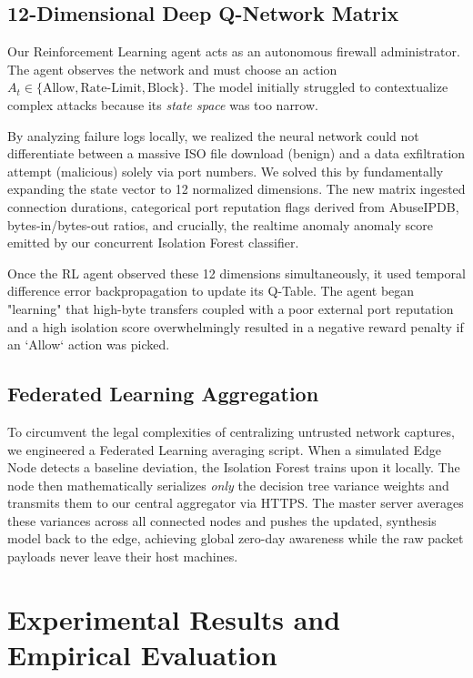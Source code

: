 \documentclass[conference]{IEEEtran}
\begin{document}
\subsection{12-Dimensional Deep Q-Network Matrix}
Our Reinforcement Learning agent acts as an autonomous firewall administrator. The agent observes the network and must choose an action $A_t \in \{\text{Allow}, \text{Rate-Limit}, \text{Block}\}$. The model initially struggled to contextualize complex attacks because its \textit{state space} was too narrow. 

By analyzing failure logs locally, we realized the neural network could not differentiate between a massive ISO file download (benign) and a data exfiltration attempt (malicious) solely via port numbers. We solved this by fundamentally expanding the state vector to 12 normalized dimensions. The new matrix ingested connection durations, categorical port reputation flags derived from AbuseIPDB, bytes-in/bytes-out ratios, and crucially, the realtime anomaly anomaly score emitted by our concurrent Isolation Forest classifier.

Once the RL agent observed these 12 dimensions simultaneously, it used temporal difference error backpropagation to update its Q-Table. The agent began "learning" that high-byte transfers coupled with a poor external port reputation and a high isolation score overwhelmingly resulted in a negative reward penalty if an `Allow` action was picked.

\subsection{Federated Learning Aggregation}
To circumvent the legal complexities of centralizing untrusted network captures, we engineered a Federated Learning averaging script. When a simulated Edge Node detects a baseline deviation, the Isolation Forest trains upon it locally. The node then mathematically serializes \textit{only} the decision tree variance weights and transmits them to our central aggregator via HTTPS. The master server averages these variances across all connected nodes and pushes the updated, synthesis model back to the edge, achieving global zero-day awareness while the raw packet payloads never leave their host machines.

\section{Experimental Results and Empirical Evaluation}
\end{document}
